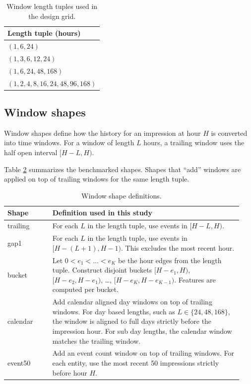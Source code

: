 \begin{table}[t]
  \centering
  \begin{tabular}{l}
    \toprule
    Length tuple (hours) \\
    \midrule
    $(1, 6, 24)$ \\
    $(1, 3, 6, 12, 24)$ \\
    $(1, 6, 24, 48, 168)$ \\
    $(1, 2, 4, 8, 16, 24, 48, 96, 168)$ \\
    \bottomrule
  \end{tabular}
  \caption{Window length tuples used in the design grid.}
  \label{tab:length_sets}
\end{table}

\subsection{Window shapes}
Window shapes define how the history for an impression at hour $H$ is converted into time windows.
For a window of length $L$ hours, a trailing window uses the half open interval $[H-L, H)$.

Table \ref{tab:window_shapes} summarizes the benchmarked shapes.
Shapes that ``add'' windows are applied on top of trailing windows for the same length tuple.

\begin{table}[t]
  \centering
  \begin{tabular}{p{0.18\linewidth}p{0.76\linewidth}}
    \toprule
    Shape & Definition used in this study \\
    \midrule
    trailing &
      For each $L$ in the length tuple, use events in $[H-L, H)$. \\
    gap1 &
      For each $L$ in the length tuple, use events in $[H-(L+1), H-1)$.
      This excludes the most recent hour. \\
    bucket &
      Let $0 < e_1 < \dots < e_K$ be the hour edges from the length tuple.
      Construct disjoint buckets $[H-e_1, H)$, $[H-e_2, H-e_1)$, \dots, $[H-e_K, H-e_{K-1})$.
      Features are computed per bucket. \\
    calendar &
      Add calendar aligned day windows on top of trailing windows.
      For day based lengths, such as $L \in \{24, 48, 168\}$, the window is aligned to full days strictly before the impression hour.
      For sub day lengths, the calendar window matches the trailing window. \\
    event50 &
      Add an event count window on top of trailing windows.
      For each entity, use the most recent 50 impressions strictly before hour $H$. \\
    \bottomrule
  \end{tabular}
  \caption{Window shape definitions.}
  \label{tab:window_shapes}
\end{table}
